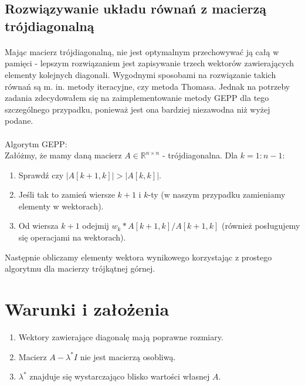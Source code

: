 \documentclass{article}
\begin{document}
\subsection{Rozwiązywanie układu równań z macierzą trójdiagonalną}
\label{tridiagonal}
\paragraph{}
Mając macierz trójdiagonalną, nie jest optymalnym przechowywać ją całą w pamięci - lepszym rozwiązaniem jest zapisywanie trzech wektorów zawierających elementy kolejnych diagonali. Wygodnymi sposobami na rozwiązanie takich równań są m. in. metody iteracyjne, czy metoda Thomasa. Jednak na potrzeby zadania zdecydowałem się na zaimplementowanie metody GEPP dla tego szczególnego przypadku, ponieważ jest ona bardziej niezawodna niż wyżej podane.
\paragraph{}
Algorytm GEPP:\\
Załóżmy, że mamy daną macierz $A\in\mathbb{R}^{n\times n}$ - trójdiagonalna. Dla $k=1:n-1$:
\begin{enumerate}
\item Sprawdź czy $|A[k+1,k]| > |A[k,k]|$.
\item Jeśli tak to zamień wiersze $k+1$ i $k$-ty (w naszym przypadku zamieniamy elementy w wektorach).
\item Od wiersza $k+1$ odejmij $w_{k}*A[k+1,k]/A[k+1,k]$ (również posługujemy się operacjami na wektorach).
\end{enumerate}
Następnie obliczamy elementy wektora wynikowego korzystając z prostego algorytmu dla macierzy trójkątnej górnej.
\section{Warunki i założenia}
\begin{enumerate}
\item Wektory zawierające diagonalę mają poprawne rozmiary.
\item Macierz $A - \lambda^*I$ nie jest macierzą osobliwą.
\item $\lambda^*$ znajduje się wystarczająco blisko wartości własnej $A$. 
\end{enumerate}
\end{document}
